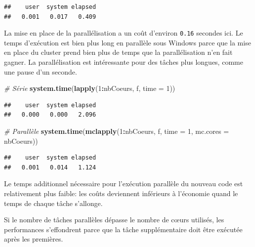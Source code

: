 \documentclass[
  12pt,
  french,
  a4paper,
  extrafontsizes,onecolumn,openright
  ]{memoir}
\newenvironment{Shaded}{\begin{snugshade}}{\end{snugshade}}
\newcommand{\AttributeTok}[1]{\textcolor[rgb]{0.13,0.29,0.53}{#1}}
\newcommand{\CommentTok}[1]{\textcolor[rgb]{0.56,0.35,0.01}{\textit{#1}}}
\newcommand{\DecValTok}[1]{\textcolor[rgb]{0.00,0.00,0.81}{#1}}
\newcommand{\FunctionTok}[1]{\textcolor[rgb]{0.13,0.29,0.53}{\textbf{#1}}}
\newcommand{\NormalTok}[1]{#1}
\newcommand{\SpecialCharTok}[1]{\textcolor[rgb]{0.81,0.36,0.00}{\textbf{#1}}}
\newlength{\rf}
\begin{document}
\begin{verbatim}
##    user  system elapsed 
##   0.001   0.017   0.409
\end{verbatim}

\normalsize

La mise en place de la parallélisation a un coût d'environ \texttt{0.16} secondes ici.
Le temps d'exécution est bien plus long en parallèle sous Windows parce que la mise en place du cluster prend bien plus de temps que la parallélisation n'en fait gagner.
La parallélisation est intéressante pour des tâches plus longues, comme une pause d'un seconde.

\scriptsize

\begin{Shaded}
\begin{Highlighting}[]
\CommentTok{\# Série}
\FunctionTok{system.time}\NormalTok{(}\FunctionTok{lapply}\NormalTok{(}\DecValTok{1}\SpecialCharTok{:}\NormalTok{nbCoeurs, f, }\AttributeTok{time =} \DecValTok{1}\NormalTok{))}
\end{Highlighting}
\end{Shaded}

\begin{verbatim}
##    user  system elapsed 
##   0.000   0.000   2.096
\end{verbatim}

\begin{Shaded}
\begin{Highlighting}[]
\CommentTok{\# Parallèle}
\FunctionTok{system.time}\NormalTok{(}\FunctionTok{mclapply}\NormalTok{(}\DecValTok{1}\SpecialCharTok{:}\NormalTok{nbCoeurs, f, }\AttributeTok{time =} \DecValTok{1}\NormalTok{, }\AttributeTok{mc.cores =}\NormalTok{ nbCoeurs))}
\end{Highlighting}
\end{Shaded}

\begin{verbatim}
##    user  system elapsed 
##   0.001   0.014   1.124
\end{verbatim}

\normalsize

Le temps additionnel nécessaire pour l'exécution parallèle du nouveau code est relativement plus faible: les coûts deviennent inférieurs à l'économie quand le temps de chaque tâche s'allonge.

Si le nombre de tâches parallèles dépasse le nombre de cœurs utilisés, les performances s'effondrent parce que la tâche supplémentaire doit être exécutée après les premières.
\end{document}
